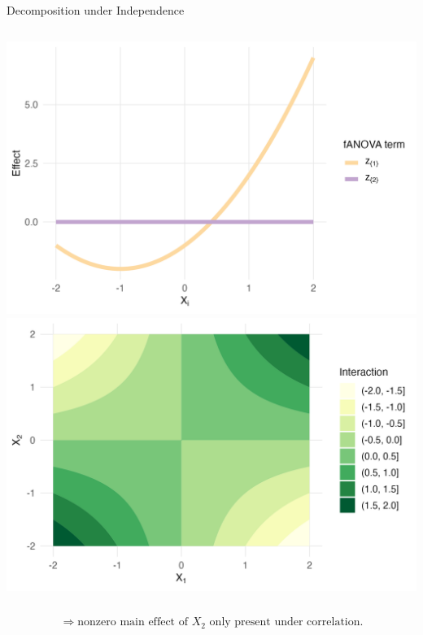 \begin{frame}{Decomposition under Independence}
  \begin{columns}
      \includegraphics[width=\linewidth]{../images/experiment_section/full_a1p20_a2p00_a11p10_a22p00_a12p05_rhop00_main.png}
      \includegraphics[width=\linewidth]{../images/experiment_section/full_a1p20_a2p00_a11p10_a22p00_a12p05_rhop00_interaction.png}
  \end{columns}
  \[
  \Rightarrow \text{nonzero main effect of } X_2 \text{ only present under correlation.}
  \]
\end{frame}





